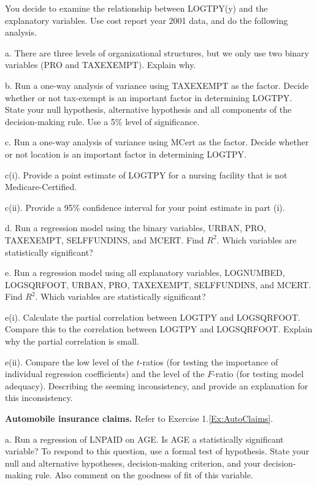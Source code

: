 \begin{exercises}
You decide to examine the relationship between LOGTPY(y) and the
explanatory variables. Use cost report year 2001 data, and do the
following analysis.

a. There are three levels of organizational structures, but we only
use two binary variables (PRO and TAXEXEMPT). Explain why.

b. Run a one-way analysis of variance using TAXEXEMPT as the factor.
Decide whether or not tax-exempt is an important factor in
determining LOGTPY. State your null hypothesis, alternative
hypothesis and all components of the decision-making rule. Use a 5\%
level of significance.

c. Run a one-way analysis of variance using MCert as the factor.
Decide whether or not location is an important factor in determining
LOGTPY.

c(i). Provide a point estimate of LOGTPY for a nursing facility that
is not Medicare-Certified.

c(ii).  Provide a 95\% confidence interval for your point estimate
in part (i).

d. Run a regression model using the binary variables, URBAN, PRO,
TAXEXEMPT, SELFFUNDINS, and MCERT. Find $R^2$. Which variables are
statistically significant?

e. Run a regression model using all explanatory variables,
LOGNUMBED, LOGSQRFOOT, URBAN, PRO, TAXEXEMPT, SELFFUNDINS, and
MCERT. Find $R^2$. Which variables are statistically significant?

e(i). Calculate the partial correlation between LOGTPY and
LOGSQRFOOT. Compare this to the correlation between LOGTPY and
LOGSQRFOOT. Explain why the partial correlation is small.

e(ii). Compare the low level of the $t$-ratios (for testing the
importance of individual regression coefficients) and the level of
the $F$-ratio (for testing model adequacy). Describing the seeming
inconsistency, and provide an explanation for this inconsistency.


\item \textbf{Automobile insurance claims.}\label{Ex:AutoClaims4} Refer to Exercise
1.\ref{Ex:AutoClaims}.

a. Run a regression of LNPAID on AGE. Is AGE a statistically
significant variable? To respond to this question, use a formal test
of hypothesis. State your null and alternative hypotheses,
decision-making criterion, and your decision-making rule. Also
comment on the goodness of fit of this variable.


\end{exercises}
